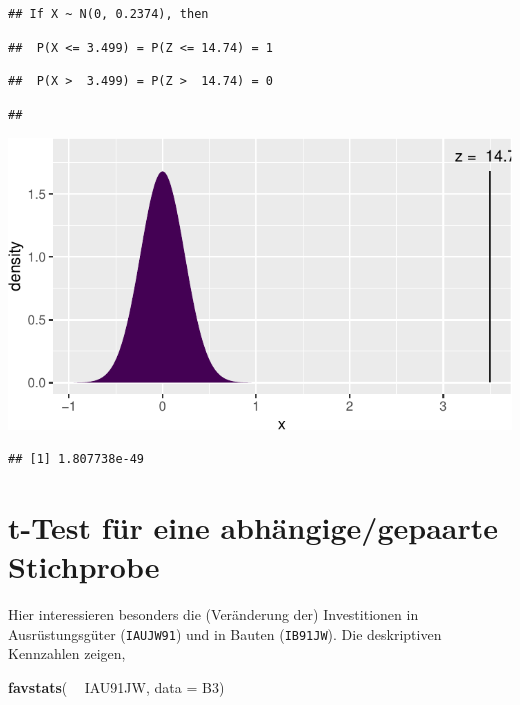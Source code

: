 \documentclass[12pt,ngerman,paper=a4,pagesize,DIV=13]{scrreprt}
\newenvironment{Shaded}{\begin{snugshade}}{\end{snugshade}}
\newcommand{\DataTypeTok}[1]{\textcolor[rgb]{0.13,0.29,0.53}{#1}}
\newcommand{\KeywordTok}[1]{\textcolor[rgb]{0.13,0.29,0.53}{\textbf{#1}}}
\newcommand{\NormalTok}[1]{#1}
\newcommand{\OperatorTok}[1]{\textcolor[rgb]{0.81,0.36,0.00}{\textbf{#1}}}
\newcommand{\StringTok}[1]{\textcolor[rgb]{0.31,0.60,0.02}{#1}}
\begin{document}
\begin{verbatim}
## If X ~ N(0, 0.2374), then
\end{verbatim}

\begin{verbatim}
##  P(X <= 3.499) = P(Z <= 14.74) = 1
\end{verbatim}

\begin{verbatim}
##  P(X >  3.499) = P(Z >  14.74) = 0
\end{verbatim}

\begin{verbatim}
## 
\end{verbatim}

\includegraphics{DatenerhebungStatistik-Uebung_files/figure-latex/unnamed-chunk-129-1.pdf}

\begin{verbatim}
## [1] 1.807738e-49
\end{verbatim}

\hypertarget{t-test-fur-eine-abhangigegepaarte-stichprobe}{%
\section{t-Test für eine abhängige/gepaarte
Stichprobe}\label{t-test-fur-eine-abhangigegepaarte-stichprobe}}

Hier interessieren besonders die (Veränderung der) Investitionen in
Ausrüstungsgüter (\texttt{IAUJW91}) und in Bauten (\texttt{IB91JW}). Die
deskriptiven Kennzahlen zeigen,

\begin{Shaded}
\begin{Highlighting}[]
\KeywordTok{favstats}\NormalTok{( }\OperatorTok{~}\StringTok{ }\NormalTok{IAU91JW, }\DataTypeTok{data =}\NormalTok{ B3)}
\end{Highlighting}
\end{Shaded}
\end{document}
